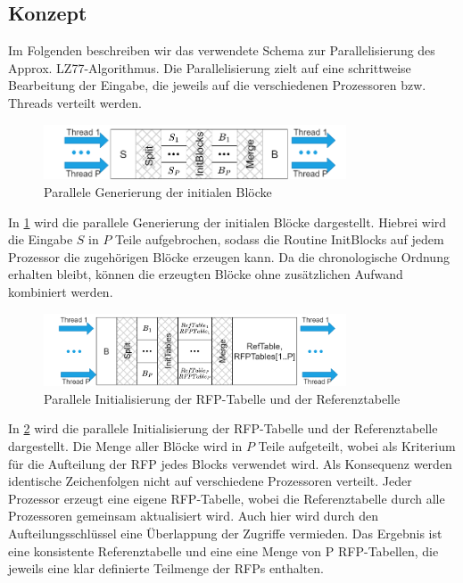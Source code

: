 \subsection{Konzept}
Im Folgenden beschreiben wir das verwendete Schema zur Parallelisierung des Approx. LZ77-Algorithmus. Die Parallelisierung zielt auf eine schrittweise Bearbeitung der Eingabe, die jeweils
auf die verschiedenen Prozessoren bzw. Threads verteilt werden. 
\begin{figure}[h]
    \centering
    \includegraphics[width=0.8\textwidth]{Images/parallel_initnodes.png}
    \caption{Parallele Generierung der initialen Blöcke}
    \label{fig:parinitnodes}
\end{figure}
In \ref{fig:parinitnodes} wird die parallele Generierung der initialen Blöcke dargestellt. Hiebrei wird die Eingabe $S$ in $P$ Teile aufgebrochen, sodass die Routine InitBlocks auf jedem Prozessor
die zugehörigen Blöcke erzeugen kann. Da die chronologische Ordnung erhalten bleibt, können die erzeugten Blöcke ohne zusätzlichen Aufwand kombiniert werden.

\begin{figure}[h]
    \centering
    \includegraphics[width=0.8\textwidth]{Images/parallel_inittables.png}
    \caption{Parallele Initialisierung der RFP-Tabelle und der Referenztabelle}
    \label{fig:parinittables}
\end{figure}
In \ref{fig:parinittables} wird die parallele Initialisierung der RFP-Tabelle und der Referenztabelle dargestellt. Die Menge aller Blöcke wird in $P$ Teile aufgeteilt, wobei als Kriterium für die
Aufteilung der RFP jedes Blocks verwendet wird. Als Konsequenz werden identische Zeichenfolgen nicht auf verschiedene Prozessoren verteilt. Jeder Prozessor erzeugt eine eigene RFP-Tabelle, wobei
die Referenztabelle durch alle Prozessoren gemeinsam aktualisiert wird. Auch hier wird durch den Aufteilungsschlüssel eine Überlappung der Zugriffe vermieden. Das Ergebnis ist eine konsistente
Referenztabelle und eine eine Menge von P RFP-Tabellen, die jeweils eine klar definierte Teilmenge der RFPs enthalten.

